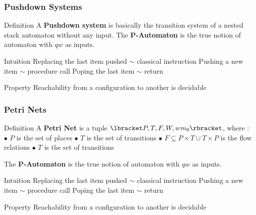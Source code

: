 \documentclass[pdf]{beamer}
\begin{document}
\begin{frame}
\frametitle{Pushdown Systems}

\begin{block}{Definition}
A \textbf{Pushdown system} is basically the transition system of a nested stack automaton without any input.\newline
The \textbf{P-Automaton} is the true notion of automaton with $qw$ as inputs.\newline
\end{block}

\begin{exampleblock}{Intuition}
Replacing the last item pushed $\sim$ classical instruction \newline
Pushing a new item $\sim$ procedure call \newline
Poping the last item $\sim$ return
\end{exampleblock}

\begin{alertblock}{Property}
Reachability from a configuration to another is decidable
\end{alertblock}

\end{frame}

\begin{frame}
\frametitle{Petri Nets}

\begin{block}{Definition}
A \textbf{Petri Net} is a tuple $\lbracket P,T,F,W,wm_0 \rbracket$, where : \newline
$\bullet$ $P$ is the set of places \newline
$\bullet$ $T$ is the set of transitions \newline
$\bullet$ $F \subseteq P \times T \cup T \times P$ is the flow relations \newline
$\bullet$ $T$ is the set of transitions \newline

The \textbf{P-Automaton} is the true notion of automaton with $qw$ as inputs.\newline
\end{block}

\begin{exampleblock}{Intuition}
Replacing the last item pushed $\sim$ classical instruction \newline
Pushing a new item $\sim$ procedure call \newline
Poping the last item $\sim$ return
\end{exampleblock}

\begin{alertblock}{Property}
Reachability from a configuration to another is decidable
\end{alertblock}

\end{frame}
\end{document}

